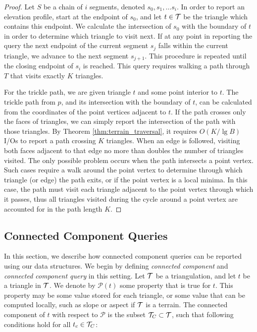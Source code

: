   \begin{proof}
  Let $S$ be a chain of $i$ segments, denoted $s_0, s_1, \ldots s_i$. 
  In order to report an elevation profile, start at the endpoint of $s_0$, and 
  let $t \in \mathcal{T}$ be the triangle which contains this endpoint. 
  We calculate the intersection of $s_0$ with the boundary of $t$ in order to determine 
  which triangle to visit next. 
  If at any point in reporting the query the next endpoint of the current segment 
  $s_j$ falls within the current triangle, we advance to the next segment 
  $s_{j+1}$. 
  This procedure is repeated until the closing endpoint of $s_i$ is reached.
  This query requires walking a path through $T$ that visits exactly $K$ triangles.

  For the trickle path, we are given triangle $t$ and some point interior to $t$. 
  The trickle path from $p$, and its intersection with the boundary of $t$, 
  can be calculated from the coordinates of the point vertices adjacent to $t$. 
  If the path crosses only the faces of triangles, we can simply report the 
  intersection of the path with those triangles.
  By Theorem \ref{thm:terrain_traversal}, it 
  requires $O(K/\lg{B})$ I/Os to report a path crossing $K$ triangles. 
  When an edge is followed, visiting both faces adjacent to that edge no more 
  than doubles the number of triangles visited. 
  The only possible problem occurs when the path intersects a point vertex. 
  Such cases require a walk around the point vertex to determine through which 
  triangle 
  (or edge) the path exits, or if the point vertex is a local minima. 
  In this case, the path must visit each triangle adjacent to the point vertex 
  through which it passes, thus all triangles visited during the cycle around a 
  point vertex are accounted for in the path length $K$.
  \end{proof}

  \subsection{Connected Component Queries}\label{sec:con_comp_queries}

  In this section, we describe how connected component queries can be reported 
  using our data structures. 
  We begin by defining \emph{connected component} and \emph{connected
  component query} in this setting.
  Let $\mathcal{T}$ be a triangulation, and let $t$ be a triangle in $\mathcal{T}$. 
  We denote by $\mathcal{P}(t)$ some property that is true for $t$.
  This property may be some value stored for each triangle, or some value that
  can be computed locally, such as slope or aspect if $\mathcal{T}$ is a terrain.
  The connected component of $t$ with respect to $\mathcal{P}$ is the 
  subset ${\mathcal{T}}_C \subset \mathcal{T}$, such that following conditions hold for
  all $t_c \in {\mathcal{T}}_C$:

